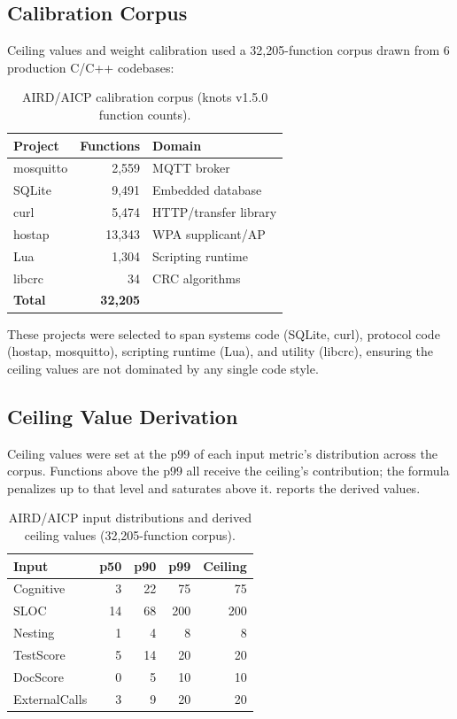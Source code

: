 \documentclass[10pt,twocolumn,letterpaper]{article}
\begin{document}
\subsection{Calibration Corpus}

Ceiling values and weight calibration used a 32,205-function corpus
drawn from 6 production C/C++ codebases:

\begin{table}[t]
\centering
\footnotesize
\begin{tabular}{@{}lrl@{}}
\toprule
\textbf{Project} & \textbf{Functions} & \textbf{Domain} \\
\midrule
mosquitto & 2{,}559  & MQTT broker \\
SQLite    & 9{,}491  & Embedded database \\
curl      & 5{,}474  & HTTP/transfer library \\
hostap    & 13{,}343 & WPA supplicant/AP \\
Lua       & 1{,}304  & Scripting runtime \\
libcrc    & 34       & CRC algorithms \\
\midrule
\textbf{Total} & \textbf{32{,}205} & \\
\bottomrule
\end{tabular}
\caption{AIRD/AICP calibration corpus (knots v1.5.0 function counts).}
\label{tab:corpus}
\end{table}

These projects were selected to span systems code (SQLite, curl), protocol
code (hostap, mosquitto), scripting runtime (Lua), and utility (libcrc),
ensuring the ceiling values are not dominated by any single code style.

\subsection{Ceiling Value Derivation}

Ceiling values were set at the p99 of each input metric's distribution
across the corpus.  Functions above the p99 all receive the ceiling's
contribution; the formula penalizes up to that level and saturates above it.
 reports the derived values.

\begin{table}[t]
\centering
\footnotesize
\begin{tabular}{@{}lrrrr@{}}
\toprule
\textbf{Input} & \textbf{p50} & \textbf{p90} & \textbf{p99} & \textbf{Ceiling} \\
\midrule
Cognitive  & 3  & 22  & 75  & 75 \\
SLOC       & 14 & 68  & 200 & 200 \\
Nesting    & 1  & 4   & 8   & 8 \\
TestScore  & 5  & 14  & 20  & 20 \\
DocScore   & 0  & 5   & 10  & 10 \\
ExternalCalls & 3 & 9  & 20  & 20 \\
\bottomrule
\end{tabular}
\caption{AIRD/AICP input distributions and derived ceiling values (32,205-function corpus).}
\label{tab:ceilings}
\end{table}
\end{document}
